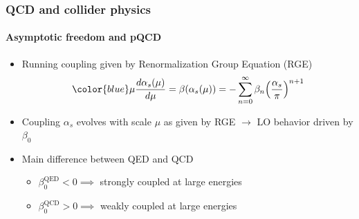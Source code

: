 \documentclass[aspectratio=43]{beamer}
\begin{document}
\begin{frame}
	
	\frametitle{QCD and collider physics}
	\framesubtitle{Asymptotic freedom and pQCD}
	
	\footnotesize
	
	\begin{itemize}
		\item Running coupling given by Renormalization Group Equation (RGE)
		\begin{equation}
		{\color{blue}\mu\frac{d\alpha_{s}(\mu)}{d\mu} = \beta(\alpha_{s}(\mu)) = -\sum_{n = 0}^{\infty} \beta_{n} \Big( \frac{\alpha_{s}}{\pi} \Big)^{n + 1}} \nonumber
		\end{equation}
		\item Coupling {\color{blue}$\alpha_{s}$} evolves with scale {\color{blue}$\mu$} as given by RGE $\rightarrow$ LO behavior driven by $\beta_{0}$
		\item Main difference between QED and QCD
		\begin{itemize}
			\item $\beta_{0}^{\textrm{QED}} < 0 \implies$ strongly coupled at large energies
			\item $\beta_{0}^{\textrm{QCD}} > 0 \implies$ weakly coupled at large energies
		\end{itemize}
	\end{itemize}

\end{frame}
\end{document}
